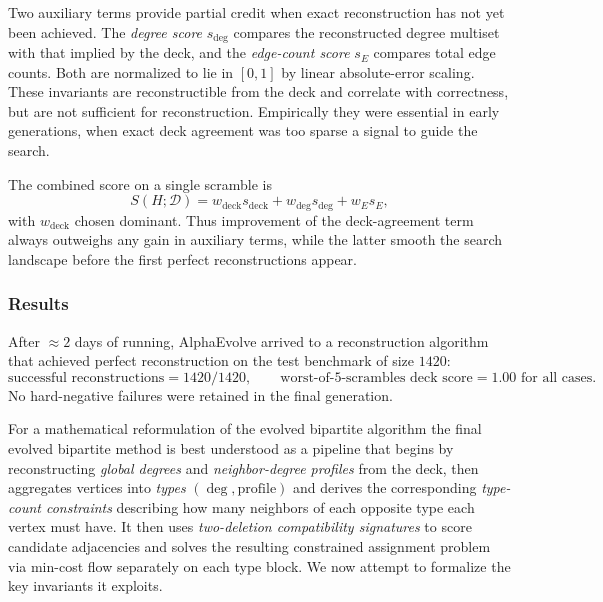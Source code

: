 \documentclass[11pt]{amsart}
\begin{document}
Two auxiliary terms provide partial credit when exact reconstruction has not yet been achieved.
The \emph{degree score} $s_{\deg}$ compares the reconstructed degree multiset with that implied by the deck, and the \emph{edge-count score} $s_E$ compares total edge counts.
Both are normalized to lie in $[0,1]$ by linear absolute-error scaling.
These invariants are reconstructible from the deck and correlate with correctness, but are not sufficient for reconstruction.
Empirically they were essential in early generations, when exact deck agreement was too sparse a signal to guide the search.

The combined score on a single scramble is
\[
S(H;\mathcal{D})
=
w_{\mathrm{deck}} s_{\mathrm{deck}}
+
w_{\deg} s_{\deg}
+
w_E s_E,
\]
with $w_{\mathrm{deck}}$ chosen dominant.
Thus improvement of the deck-agreement term always outweighs any gain in auxiliary terms, while the latter smooth the search landscape before the first perfect reconstructions appear.


\subsubsection{Results}
After $\approx 2$ days of running, AlphaEvolve arrived to a reconstruction algorithm that achieved perfect reconstruction on the test benchmark of size $1420$:
\[
\text{successful reconstructions} = 1420/1420,\qquad
\text{worst-of-5-scrambles deck score} = 1.00\text{ for all cases.}
\]
No hard-negative failures were retained in the final generation.

For a mathematical reformulation of the evolved bipartite algorithm the final evolved bipartite method is best understood as a pipeline that begins by reconstructing \emph{global degrees} and \emph{neighbor-degree profiles} from the deck, then aggregates vertices into \emph{types} $(\deg,\text{profile})$ and derives the corresponding \emph{type-count constraints} describing how many neighbors of each opposite type each vertex must have. It then uses \emph{two-deletion compatibility signatures} to score candidate adjacencies and solves the resulting constrained assignment problem via min-cost flow separately on each type block. We now attempt to formalize the key invariants it exploits.
\end{document}
